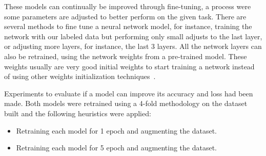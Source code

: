 These models can continually be improved through fine-tuning, a process were some parameters are adjusted to better perform on the given task. There are several methods to fine tune a neural network model, for instance, training the network with our labeled data but performing only small adjusts to the last layer, or adjusting more layers, for instance, the last 3 layers. All the network layers can also be retrained, using the network weights from a pre-trained model. These weights usually are very good initial weights to start training a network instead of using other weights initialization techniques~\cite{Masood2016}.


\iffalse
At Caffe framework the training is accomplish using a solver which is responsible to optimize the models weights to minimize the classification loss, it coordinates the network's forward inference and backward gradient to update the weights and accomplish that goal.

The type of solver used was the Stochastic Gradient Descent (SGD). It updates the network weights ($W$) using a linear combination of the negative gradient $\triangledown L\left ( W_t \right )$ and the previous weight update $V_t$. 

$$ V_{t + 1} = \mu V_t - \alpha \triangledown L\left ( W_t \right ) $$ 

$$ W_{t+1}=W_t+V_{t+1} $$ 

The \emph{learning rate} ($\alpha$) represents the weight of the negative gradient, and the \emph{momentum} ($\mu$) the weight of the previous update.
\fi

Experiments to evaluate if a model can improve its accuracy and loss had been made. Both models were retrained using a 4-fold methodology on the dataset built and the following heuristics were applied:

\begin{itemize}
\item Retraining each model for 1 epoch and augmenting the dataset.
\item Retraining each model for 5 epoch and augmenting the dataset.
\end{itemize}


